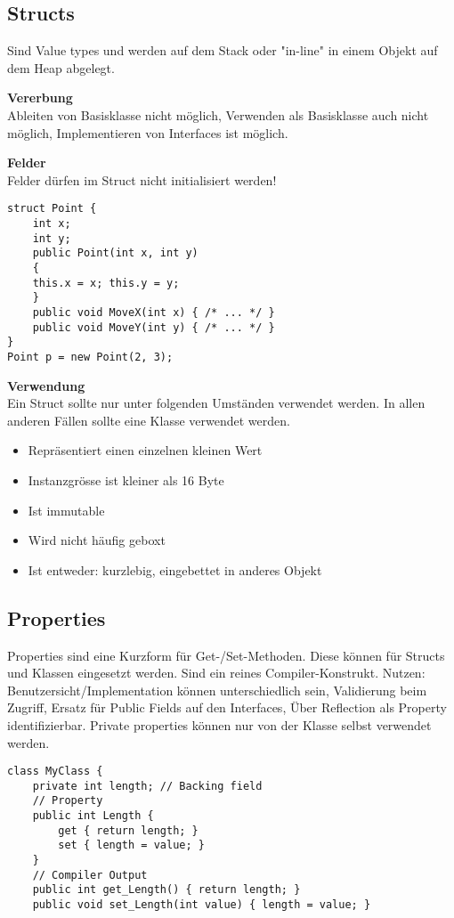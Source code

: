 \subsection{Structs}
Sind Value types und werden auf dem Stack oder "in-line" in einem Objekt auf dem Heap abgelegt.

\textbf{Vererbung} \\
Ableiten von Basisklasse nicht möglich, Verwenden als Basisklasse auch nicht möglich, Implementieren von Interfaces ist möglich.

\textbf{Felder} \\
Felder dürfen im Struct nicht initialisiert werden!

\begin{lstlisting}
struct Point {
	int x;
	int y;
	public Point(int x, int y)
	{
	this.x = x; this.y = y; 
	} 
	public void MoveX(int x) { /* ... */ } 
	public void MoveY(int y) { /* ... */ }
}
Point p = new Point(2, 3); 
\end{lstlisting}

\textbf{Verwendung} \\
Ein Struct sollte nur unter folgenden Umständen verwendet werden. In allen anderen Fällen sollte eine Klasse verwendet werden.
\begin{itemize}
  \itemsep -0.5em 
  \item Repräsentiert einen einzelnen kleinen Wert
  \item Instanzgrösse ist kleiner als 16 Byte
  \item Ist immutable
  \item Wird nicht häufig geboxt
  \item Ist entweder: kurzlebig, eingebettet in anderes Objekt
\end{itemize}

\subsection{Properties}
Properties sind eine Kurzform für Get-/Set-Methoden. Diese können für Structs und Klassen eingesetzt werden. Sind ein reines Compiler-Konstrukt. Nutzen: Benutzersicht/Implementation können unterschiedlich sein, Validierung beim Zugriff, Ersatz für Public Fields auf den Interfaces, Über Reflection als Property identifizierbar. Private properties können nur von der Klasse selbst verwendet werden.
\begin{lstlisting}
class MyClass {
	private int length; // Backing field
	// Property
	public int Length {
		get { return length; }
		set { length = value; }
	}
	// Compiler Output
	public int get_Length() { return length; } 
	public void set_Length(int value) { length = value; }
\end{lstlisting}

